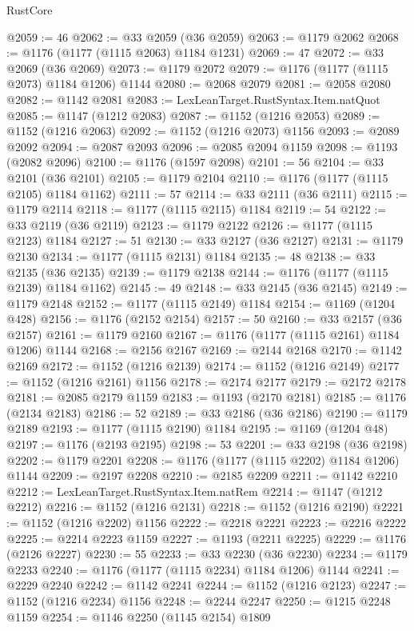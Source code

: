 \begin{lexlean}{RustCore}
\begin{coremodule}
@2059 := 46
@2062 := @33 @2059 (@36 @2059)
@2063 := @1179 @2062
@2068 := @1176 (@1177 (@1115 @2063) @1184 @1231)
@2069 := 47
@2072 := @33 @2069 (@36 @2069)
@2073 := @1179 @2072
@2079 := @1176 (@1177 (@1115 @2073) @1184 @1206) @1144
@2080 := @2068 @2079
@2081 := @2058 @2080
@2082 := @1142 @2081
@2083 := LexLeanTarget.RustSyntax.Item.natQuot
@2085 := @1147 (@1212 @2083)
@2087 := @1152 (@1216 @2053)
@2089 := @1152 (@1216 @2063)
@2092 := @1152 (@1216 @2073) @1156
@2093 := @2089 @2092
@2094 := @2087 @2093
@2096 := @2085 @2094 @1159
@2098 := @1193 (@2082 @2096)
@2100 := @1176 (@1597 @2098)
@2101 := 56
@2104 := @33 @2101 (@36 @2101)
@2105 := @1179 @2104
@2110 := @1176 (@1177 (@1115 @2105) @1184 @1162)
@2111 := 57
@2114 := @33 @2111 (@36 @2111)
@2115 := @1179 @2114
@2118 := @1177 (@1115 @2115) @1184
@2119 := 54
@2122 := @33 @2119 (@36 @2119)
@2123 := @1179 @2122
@2126 := @1177 (@1115 @2123) @1184
@2127 := 51
@2130 := @33 @2127 (@36 @2127)
@2131 := @1179 @2130
@2134 := @1177 (@1115 @2131) @1184
@2135 := 48
@2138 := @33 @2135 (@36 @2135)
@2139 := @1179 @2138
@2144 := @1176 (@1177 (@1115 @2139) @1184 @1162)
@2145 := 49
@2148 := @33 @2145 (@36 @2145)
@2149 := @1179 @2148
@2152 := @1177 (@1115 @2149) @1184
@2154 := @1169 (@1204 @428)
@2156 := @1176 (@2152 @2154)
@2157 := 50
@2160 := @33 @2157 (@36 @2157)
@2161 := @1179 @2160
@2167 := @1176 (@1177 (@1115 @2161) @1184 @1206) @1144
@2168 := @2156 @2167
@2169 := @2144 @2168
@2170 := @1142 @2169
@2172 := @1152 (@1216 @2139)
@2174 := @1152 (@1216 @2149)
@2177 := @1152 (@1216 @2161) @1156
@2178 := @2174 @2177
@2179 := @2172 @2178
@2181 := @2085 @2179 @1159
@2183 := @1193 (@2170 @2181)
@2185 := @1176 (@2134 @2183)
@2186 := 52
@2189 := @33 @2186 (@36 @2186)
@2190 := @1179 @2189
@2193 := @1177 (@1115 @2190) @1184
@2195 := @1169 (@1204 @48)
@2197 := @1176 (@2193 @2195)
@2198 := 53
@2201 := @33 @2198 (@36 @2198)
@2202 := @1179 @2201
@2208 := @1176 (@1177 (@1115 @2202) @1184 @1206) @1144
@2209 := @2197 @2208
@2210 := @2185 @2209
@2211 := @1142 @2210
@2212 := LexLeanTarget.RustSyntax.Item.natRem
@2214 := @1147 (@1212 @2212)
@2216 := @1152 (@1216 @2131)
@2218 := @1152 (@1216 @2190)
@2221 := @1152 (@1216 @2202) @1156
@2222 := @2218 @2221
@2223 := @2216 @2222
@2225 := @2214 @2223 @1159
@2227 := @1193 (@2211 @2225)
@2229 := @1176 (@2126 @2227)
@2230 := 55
@2233 := @33 @2230 (@36 @2230)
@2234 := @1179 @2233
@2240 := @1176 (@1177 (@1115 @2234) @1184 @1206) @1144
@2241 := @2229 @2240
@2242 := @1142 @2241
@2244 := @1152 (@1216 @2123)
@2247 := @1152 (@1216 @2234) @1156
@2248 := @2244 @2247
@2250 := @1215 @2248 @1159
@2254 := @1146 @2250 (@1145 @2154) @1809

\end{coremodule}
\end{lexlean}
